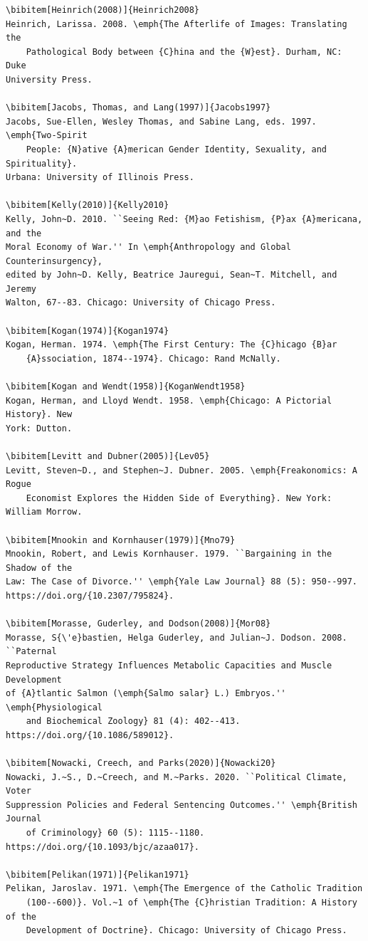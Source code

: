 \documentclass[]{interact}
\theoremstyle{plain}%
\theoremstyle{definition}
\theoremstyle{remark}
\begin{document}
\begin{verbatim}
\bibitem[Heinrich(2008)]{Heinrich2008}
Heinrich, Larissa. 2008. \emph{The Afterlife of Images: Translating the
	Pathological Body between {C}hina and the {W}est}. Durham, NC: Duke
University Press.

\bibitem[Jacobs, Thomas, and Lang(1997)]{Jacobs1997}
Jacobs, Sue-Ellen, Wesley Thomas, and Sabine Lang, eds. 1997. \emph{Two-Spirit
	People: {N}ative {A}merican Gender Identity, Sexuality, and Spirituality}.
Urbana: University of Illinois Press.

\bibitem[Kelly(2010)]{Kelly2010}
Kelly, John~D. 2010. ``Seeing Red: {M}ao Fetishism, {P}ax {A}mericana, and the
Moral Economy of War.'' In \emph{Anthropology and Global Counterinsurgency},
edited by John~D. Kelly, Beatrice Jauregui, Sean~T. Mitchell, and Jeremy
Walton, 67--83. Chicago: University of Chicago Press.

\bibitem[Kogan(1974)]{Kogan1974}
Kogan, Herman. 1974. \emph{The First Century: The {C}hicago {B}ar
	{A}ssociation, 1874--1974}. Chicago: Rand McNally.

\bibitem[Kogan and Wendt(1958)]{KoganWendt1958}
Kogan, Herman, and Lloyd Wendt. 1958. \emph{Chicago: A Pictorial History}. New
York: Dutton.

\bibitem[Levitt and Dubner(2005)]{Lev05}
Levitt, Steven~D., and Stephen~J. Dubner. 2005. \emph{Freakonomics: A Rogue
	Economist Explores the Hidden Side of Everything}. New York: William Morrow.

\bibitem[Mnookin and Kornhauser(1979)]{Mno79}
Mnookin, Robert, and Lewis Kornhauser. 1979. ``Bargaining in the Shadow of the
Law: The Case of Divorce.'' \emph{Yale Law Journal} 88 (5): 950--997.
https://doi.org/{10.2307/795824}.

\bibitem[Morasse, Guderley, and Dodson(2008)]{Mor08}
Morasse, S{\'e}bastien, Helga Guderley, and Julian~J. Dodson. 2008. ``Paternal
Reproductive Strategy Influences Metabolic Capacities and Muscle Development
of {A}tlantic Salmon (\emph{Salmo salar} L.) Embryos.'' \emph{Physiological
	and Biochemical Zoology} 81 (4): 402--413. https://doi.org/{10.1086/589012}.

\bibitem[Nowacki, Creech, and Parks(2020)]{Nowacki20}
Nowacki, J.~S., D.~Creech, and M.~Parks. 2020. ``Political Climate, Voter
Suppression Policies and Federal Sentencing Outcomes.'' \emph{British Journal
	of Criminology} 60 (5): 1115--1180. https://doi.org/{10.1093/bjc/azaa017}.

\bibitem[Pelikan(1971)]{Pelikan1971}
Pelikan, Jaroslav. 1971. \emph{The Emergence of the Catholic Tradition
	(100--600)}. Vol.~1 of \emph{The {C}hristian Tradition: A History of the
	Development of Doctrine}. Chicago: University of Chicago Press.


\end{verbatim}
\end{document}
